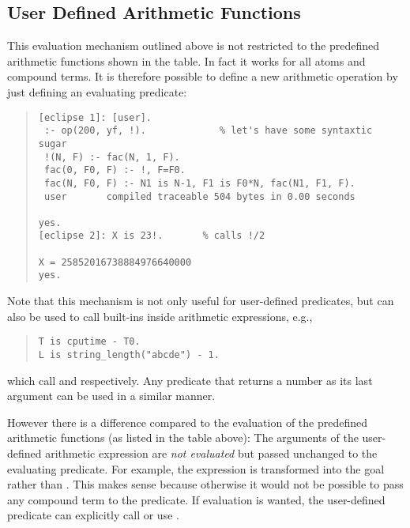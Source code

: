 \subsection{User Defined Arithmetic Functions}
This evaluation mechanism outlined above is not restricted to the
predefined arithmetic functions shown in the table.
In fact it works for all atoms and compound terms.
It is therefore possible to define a new arithmetic operation by
just defining an evaluating predicate:
\begin{quote}
\begin{verbatim}
[eclipse 1]: [user].
 :- op(200, yf, !).             % let's have some syntaxtic sugar
 !(N, F) :- fac(N, 1, F).
 fac(0, F0, F) :- !, F=F0.
 fac(N, F0, F) :- N1 is N-1, F1 is F0*N, fac(N1, F1, F).
 user       compiled traceable 504 bytes in 0.00 seconds

yes.
[eclipse 2]: X is 23!.       % calls !/2

X = 25852016738884976640000
yes.
\end{verbatim}
\end{quote}
Note that this mechanism is not only useful for user-defined predicates, but
can also be used to call {\eclipse} built-ins inside arithmetic expressions,
e.g.,
\begin{quote}
\begin{verbatim}
T is cputime - T0.
L is string_length("abcde") - 1.
\end{verbatim}\end{quote}
which call  and
respectively.
Any predicate that returns a number as its last argument
can be used in a similar manner.

However there is a difference compared to the evaluation of the predefined
arithmetic functions (as listed in the table above):
The arguments of the user-defined arithmetic expression are \emph{not
evaluated} but passed unchanged to the evaluating predicate.
For example, the expression  is transformed into the goal
 rather than .
This makes sense because otherwise it would not be possible to pass
any compound term to the predicate.
If evaluation is wanted, the user-defined predicate can explicitly call
 or use .

